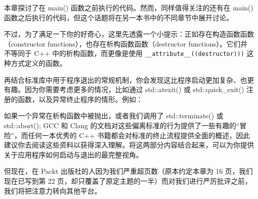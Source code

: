 
本章探讨了在 main() 函数之前执行的代码。然而，同样值得关注的还有在 main() 函数之后执行的代码，但这个话题将在另一本书中的不同章节中展开讨论。

不过，为了满足一下你的好奇心，这里先透露一个小提示：正如存在构造函数函数（constructor functions），也存在析构函数函数（destructor functions）。它们并不等同于 C++ 中的析构函数，而更像是使用 \verb|__attribute__((destructor)))| 这种方式定义的函数。

再结合标准库中用于程序退出的常规机制，你会发现这比程序启动更加复杂、也更有趣。因为你需要考虑更多的情况，比如通过 std::atexit() 或 std::quick\_exit() 注册的函数，以及异常终止程序的情形。例如：

如果一个异常在析构函数中被抛出，或者我们调用了 std::terminate() 或 std::abort(); GCC 和 Clang 的文档对这些偏离标准的行为提供了一些有趣的“冒险”，而任何一本优秀的 C++ 书籍都会对标准的终止流程提供全面的概述，因此建议你去阅读这些资料以获得深入理解。将这两部分内容结合起来，可以为你提供关于应用程序如何启动与退出的最完整视角。

但现在，在 Packt 出版社的人因为我们严重超页数（原本约定本章为 16 页，我们现在已写到第 22 页，却只覆盖了原定主题的一半）而对我们进行严厉批评之前，我们将把注意力转向其他平台。